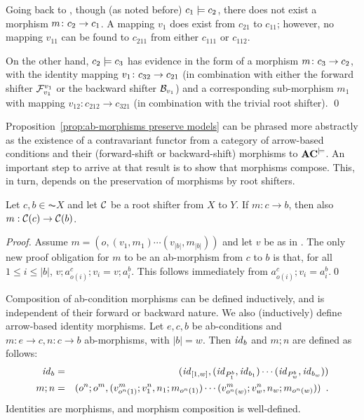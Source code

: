 \begin{example}
Going back to , though (as noted before) $c_1\models c_2$, there does not exist a morphism $m\colon c_2\rightarrow c_1$. A mapping $v_1$ does exist from $c_{21}$ to $c_{11}$; however, no mapping $v_{11}$ can be found to $c_{211}$ from either $c_{111}$ or $c_{112}$. 

On the other hand, $c_2\models c_3$ has evidence in the form of a morphism $m\colon c_3\rightarrow c_2$, with the identity mapping $v_1\colon c_{32} \rightarrow c_{21}$ (in combination with either the forward shifter $\mathcal{F}_{v_1}^{v_1}$ or the backward shifter $\mathcal{B}_{v_1}$) and a corresponding sub-morphism $m_1$ with mapping $v_{12}:c_{212}\to c_{321}$ (in combination with the trivial root shifter).
\qed
\end{example}
%
Proposition~\ref{prop:ab-morphisms preserve models} can be phrased more abstractly as the existence of a contravariant functor from a category of arrow-based conditions and their (forward-shift or backward-shift) morphisms to $\mathbf{AC}^{\models}$. An important step to arrive at that result is to show that morphisms compose. This, in turn, depends on the preservation of morphisms by root shifters.

\begin{lemma}
Let $c,b \in  \AC{X}$ and let $\mathcal{C}$ be a root shifter from $X$ to $Y$. If $m:c\to b$, then also $m:\mathcal{C}(c)\rightarrow\mathcal{C}(b)$. 
\end{lemma}
%
\begin{fullorname}
\begin{proof}
Assume $m = (o,(v_1,m_1)\cdots(v_{|b|},m_{|b|}))$ and let $v$ be as in . The only new proof obligation for $m$ to be an ab-morphism from $c$ to $b$ is that, for all $1\leq i\leq |b|$, $v;a^c_{o(i)};v_i=v;a^b_i$. This follows immediately from $a^c_{o(i)};v_i=a^b_i$.\qed
\end{proof}
\end{fullorname}
%
Composition of ab-condition morphisms can be defined inductively, and is independent of their forward or backward nature. We also (inductively) define arrow-based identity morphisms. Let $e,c,b$ be ab-conditions and $m:e\to c,n:c\to b$ ab-morphisms, with $|b|=w$. Then $\mathit{id}_b$ and $m;n$ are defined as follows: 
%
\begin{eqnarray}
\id_b & =
  & (\id_{[1,w]},(\id_{P^b_1},\id_{b_1})\cdots 
                 (\id_{P^b_w},\id_{b_w}))
  \eqlabel{id-morphism} \\
m;n & =
  & (o^n;o^m,(v^m_{o^n(1)};v^n_1,n_1;m_{o^n(1)})\cdots 
              (v^m_{o^n(w)};v^n_w,n_w;m_{o^n(w)})) \enspace.
 \eqlabel{morphism composition}
\end{eqnarray}
%
Identities are morphisms, and morphism composition is well-defined.

